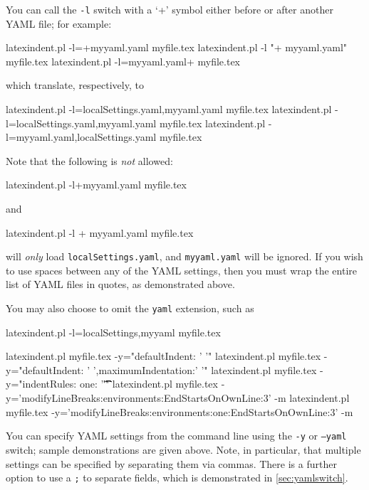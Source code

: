 	You can call the \texttt{-l} switch with a `+' symbol either before or after
	 another YAML file; for example:
	\begin{commandshell}
latexindent.pl -l=+myyaml.yaml myfile.tex
latexindent.pl -l "+ myyaml.yaml" myfile.tex
latexindent.pl -l=myyaml.yaml+  myfile.tex
\end{commandshell}
	which translate, respectively, to
	\begin{commandshell}
latexindent.pl -l=localSettings.yaml,myyaml.yaml myfile.tex
latexindent.pl -l=localSettings.yaml,myyaml.yaml myfile.tex
latexindent.pl -l=myyaml.yaml,localSettings.yaml myfile.tex
\end{commandshell}
	Note that the following is \emph{not} allowed:
	\begin{commandshell}
latexindent.pl -l+myyaml.yaml myfile.tex
\end{commandshell}
	and
	\begin{commandshell}
latexindent.pl -l + myyaml.yaml myfile.tex
\end{commandshell}
	will \emph{only} load \texttt{localSettings.yaml}, and \texttt{myyaml.yaml}
	will be ignored. If you wish to use spaces between any of the YAML settings, then you
	must wrap the entire list of YAML files in quotes, as demonstrated above.

	You may also choose to omit the \texttt{yaml} extension, such as
	\begin{commandshell}
latexindent.pl -l=localSettings,myyaml myfile.tex
\end{commandshell}
	\begin{commandshell}
latexindent.pl myfile.tex -y="defaultIndent: ' '"
latexindent.pl myfile.tex -y="defaultIndent: ' ',maximumIndentation:' '"
latexindent.pl myfile.tex -y="indentRules: one: '\t\t\t\t'"
latexindent.pl myfile.tex -y='modifyLineBreaks:environments:EndStartsOnOwnLine:3' -m
latexindent.pl myfile.tex -y='modifyLineBreaks:environments:one:EndStartsOnOwnLine:3' -m
\end{commandshell}
	\label{page:yamlswitch}You%
	 can specify YAML settings from the command line using the
	\texttt{-y} or \texttt{--yaml} switch;
	sample demonstrations are given above.	Note, in particular, that multiple settings can
	be specified by separating them via commas. There is a further option to use a
	\texttt{;} to separate fields, which is demonstrated in
	\vref{sec:yamlswitch}.

